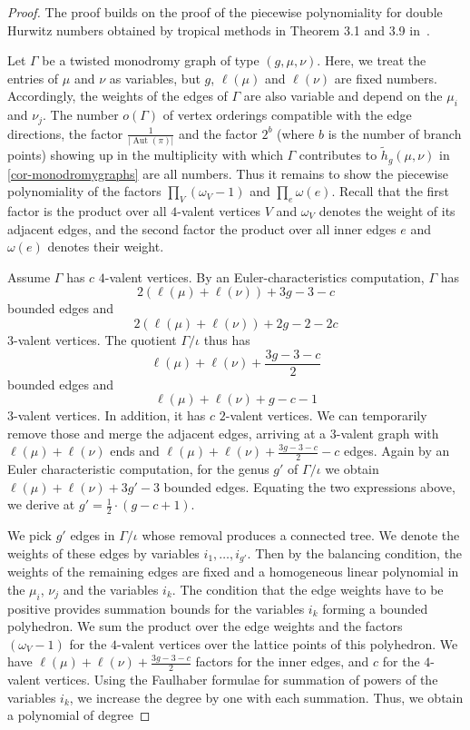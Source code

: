 \documentclass[10pt]{amsart}
\theoremstyle{plain}
\theoremstyle{definition}
\theoremstyle{definition}
\theoremstyle{plain}
\theoremstyle{plain}
\theoremstyle{remark}
\theoremstyle{plain}
\theoremstyle{plain}
\DeclareMathOperator{\Aut}{Aut}
\begin{document}
\begin{proof}
The proof builds on the proof of the piecewise polynomiality for double Hurwitz numbers obtained by tropical methods in Theorem 3.1 and 3.9 in~\cite{CJM11}.

Let $\Gamma$ be a twisted monodromy graph of type $(g,\mu,\nu)$. Here, we treat the entries of $\mu$ and $\nu$ as variables, but $g$, $\ell(\mu)$ and $\ell(\nu)$ are fixed numbers. Accordingly, the weights of the edges of $\Gamma$ are also variable and depend on the $\mu_i$ and $\nu_j$. The number $o(\Gamma)$ of vertex orderings compatible with the edge directions, the factor $\frac{1}{|\Aut(\pi)|}$ and the factor $2^{b}$ (where $b$ is the number of branch points) showing up in the multiplicity with which $\Gamma$ contributes to $\tilde{h}_g(\mu,\nu)$ in \cref{cor-monodromygraphs} are all numbers. Thus it remains to show the piecewise polynomiality of the factors $\prod_V (\omega_V-1)$ and $\prod_e\omega(e)$. Recall that the first factor is the product over all $4$-valent vertices $V$ and $\omega_V$ denotes the weight of its adjacent edges, and the second factor the product over all inner edges $e$ and $\omega(e)$ denotes their weight.

Assume $\Gamma$ has $c$ $4$-valent vertices. By an Euler-characteristics computation, $\Gamma$ has $$2(\ell(\mu)+\ell(\nu))+3g-3-c$$ bounded edges and $$ 2(\ell(\mu)+\ell(\nu))+2g-2-2c$$ $3$-valent vertices. The quotient $\Gamma/\iota$ thus has $$\ell(\mu)+\ell(\nu)+\frac{3g-3-c}{2}$$ bounded edges and $$\ell(\mu)+\ell(\nu)+g-c-1$$ $3$-valent vertices. In addition, it has $c$ $2$-valent vertices. We can temporarily remove those and merge the adjacent edges, arriving at a $3$-valent graph with $\ell(\mu)+\ell(\nu)$ ends and $\ell(\mu)+\ell(\nu)+\frac{3g-3-c}{2}-c$ edges. Again by an Euler characteristic computation, for the genus $g'$ of $\Gamma/\iota$ we obtain
$\ell(\mu)+\ell(\nu)+3g'-3$ bounded edges. Equating the two expressions above, we derive at $g'=\frac{1}{2}\cdot (g-c+1)$.

We pick  $g'$ edges in $\Gamma/\iota$ whose removal produces a connected tree. We denote the weights of these edges by variables $i_1,\ldots,i_{g'}$. Then by the balancing condition, the weights of the remaining edges are fixed and a homogeneous linear polynomial in the $\mu_i$, $\nu_j$ and the variables $i_k$. The condition that the edge weights have to be positive provides summation bounds for the variables $i_k$ forming a bounded polyhedron. We sum the product over the edge weights and the factors $(\omega_V-1)$ for the $4$-valent vertices over the lattice points of this polyhedron. We have $\ell(\mu)+\ell(\nu)+\frac{3g-3-c}{2}$ factors for the inner edges, and $c$ for the $4$-valent vertices. Using the Faulhaber formulae for summation of powers of the variables $i_k$, we increase the degree by one with each summation.
Thus, we obtain a polynomial of degree 


\end{proof}
\end{document}
